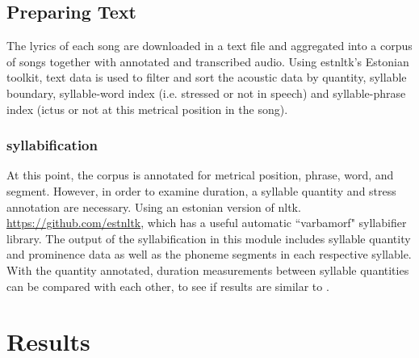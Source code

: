 \documentclass[11pt]{article}
\begin{document}
\subsection*{Preparing Text}

The lyrics of each song are downloaded in a text file and aggregated into a corpus of songs together with annotated and transcribed audio. Using estnltk's Estonian toolkit, text data is used to filter and sort the acoustic data by quantity, syllable boundary, syllable-word index (i.e. stressed or not in speech) and syllable-phrase index (ictus or not at this metrical position in the song). 

\subsubsection*{syllabification}

At this point, the corpus is annotated for metrical position, phrase, word, and segment. However, in order to examine duration, a syllable quantity and stress annotation are necessary. Using an estonian version of nltk. \url{https://github.com/estnltk}, which has a useful automatic ``varbamorf"  syllabifier library. The output of the syllabification in this module includes syllable quantity and prominence data as well as the phoneme segments in each respective syllable. With the quantity annotated, duration measurements between syllable quantities can be compared with each other, to see if results are similar to \cite{rossTradeoffQuantityStress1996}.\\













\section*{Results}
\end{document}
